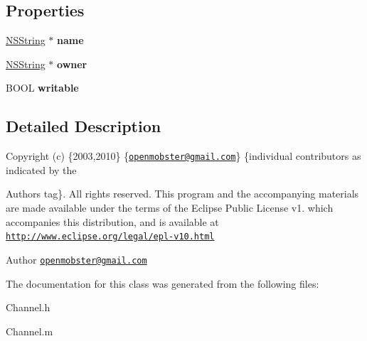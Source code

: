 \subsection*{\-Properties}
\begin{DoxyCompactItemize}
\item 
\hypertarget{interface_channel_a10427d10e009025674146f604b6edb35}{
\hyperlink{class_n_s_string}{\-N\-S\-String} $\ast$ {\bfseries name}}
\label{interface_channel_a10427d10e009025674146f604b6edb35}

\item 
\hypertarget{interface_channel_a344fa676392163a5e19ef2e640b0d194}{
\hyperlink{class_n_s_string}{\-N\-S\-String} $\ast$ {\bfseries owner}}
\label{interface_channel_a344fa676392163a5e19ef2e640b0d194}

\item 
\hypertarget{interface_channel_a02fc37595d44aa104f9d26c9e5786f74}{
\-B\-O\-O\-L {\bfseries writable}}
\label{interface_channel_a02fc37595d44aa104f9d26c9e5786f74}

\end{DoxyCompactItemize}


\subsection{\-Detailed \-Description}
\-Copyright (c) \{2003,2010\} \{\href{mailto:openmobster@gmail.com}{\tt openmobster@gmail.\-com}\} \{individual contributors as indicated by the \begin{DoxyAuthor}{\-Authors}
tag\}. \-All rights reserved. \-This program and the accompanying materials are made available under the terms of the \-Eclipse \-Public \-License v1. which accompanies this distribution, and is available at \href{http://www.eclipse.org/legal/epl-v10.html}{\tt http\-://www.\-eclipse.\-org/legal/epl-\/v10.\-html}
\end{DoxyAuthor}
\begin{DoxyAuthor}{\-Author}
\href{mailto:openmobster@gmail.com}{\tt openmobster@gmail.\-com} 
\end{DoxyAuthor}


\-The documentation for this class was generated from the following files\-:\begin{DoxyCompactItemize}
\item 
\-Channel.\-h\item 
\-Channel.\-m\end{DoxyCompactItemize}
